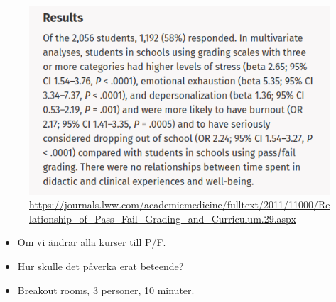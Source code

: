 \begin{frame}
  \begin{figure}
    \includegraphics[height=0.8\textheight]{grading-results.png}
    \caption{\url{https://journals.lww.com/academicmedicine/fulltext/2011/11000/Relationship_of_Pass_Fail_Grading_and_Curriculum.29.aspx}}
  \end{figure}
\end{frame}

\begin{frame}
  \begin{question}
    \begin{itemize}
      \item Om vi ändrar alla kurser till P/F.
      \item Hur skulle det påverka erat beteende?
    \end{itemize}
  \end{question}

  \begin{exercise}
    \begin{itemize}
      \item Breakout rooms, 3 personer, 10 minuter.
    \end{itemize}
  \end{exercise}
\end{frame}



